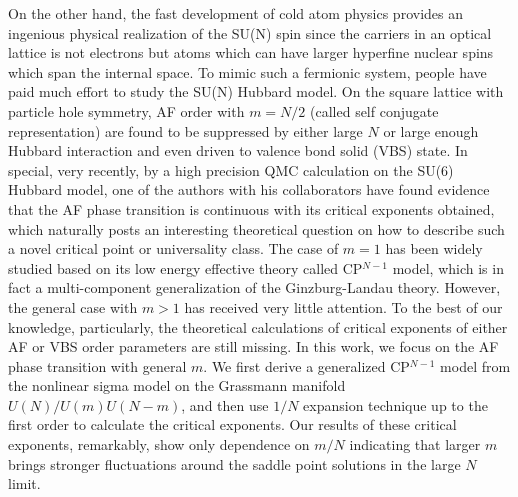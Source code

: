 \documentclass[aps,twocolumn,superscriptaddress]{revtex4-1}
\begin{document}
On the other hand, the fast development of cold atom physics provides an ingenious physical realization of the SU(N)
spin since the carriers in an optical lattice is not electrons but atoms which can have larger hyperfine nuclear spins
which span the internal space.
\cite{wu2003,wu2005,*wu2006,honerkamp2004,taie2010,desalvo2010,krauser2012,zhang2014,hart2015} To mimic such a
fermionic system, people have paid much effort to study the SU(N) Hubbard model.
\cite{honerkamp2004,assaad2005,cai2013a,cai2013,wang2014,zhou2014,*zhou2016,*zhou2017} On the square lattice with
particle hole symmetry, AF order with $m=N/2$ (called self conjugate representation) are found to be suppressed by
either large $N$ or large enough Hubbard interaction and even driven to valence bond solid (VBS) state.
\cite{cai2013,wang2014} In special, very recently, by a high precision QMC calculation on the SU(6) Hubbard model, one of the authors
with his collaborators have found evidence that the AF phase transition is continuous with its critical exponents obtained, 
\cite{wang2014,wang2018} which naturally posts an interesting theoretical question on how to describe such a novel critical point
or universality class. The case of $m=1$ has been widely studied based on its low energy effective theory
called CP$^{N-1}$ model, which is in fact a multi-component generalization of the Ginzburg-Landau theory.
\cite{halperin1974,hikami1979,read1989,read1989a,starykh1994,irkhin1996,kaul2008,block2013,demidio2017} However, the
general case with $m>1$ has received very little attention. \cite{macfarlane1979,hikami1980,duerksen1981,maharana1983}
To the best of our knowledge, particularly, the theoretical calculations of critical exponents of either AF or
VBS order parameters are still missing. In this work, we focus on the AF phase transition with general $m$. We first derive a generalized
CP$^{N-1}$ model from the nonlinear sigma model on the Grassmann manifold $U(N)/U(m)U(N-m)$, and then use $1/N$ expansion
technique up to the first order to calculate the critical exponents. Our results of these critical exponents, remarkably,
show only dependence on $m/N$ indicating that larger $m$ brings stronger fluctuations around the saddle point solutions
in the large $N$ limit.
\end{document}

